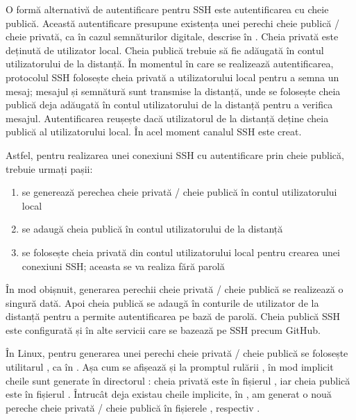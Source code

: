 O formă alternativă de autentificare pentru SSH este autentificarea cu cheie publică.
Această autentificare presupune existența unei perechi cheie publică / cheie privată, ca în cazul semnăturilor digitale, descrise în .
Cheia privată este deținută de utilizator local.
Cheia publică trebuie să fie adăugată în contul utilizatorului de la distanță.
În momentul în care se realizează autentificarea, protocolul SSH folosește cheia privată a utilizatorului local pentru a semna un mesaj; mesajul și semnătură sunt transmise la distanță, unde se folosește cheia publică deja adăugată în contul utilizatorului de la distanță pentru a verifica mesajul.
Autentificarea reușește dacă utilizatorul de la distanță deține cheia publică al utilizatorului local.
În acel moment canalul SSH este creat.

Astfel, pentru realizarea unei conexiuni SSH cu autentificare prin cheie publică, trebuie urmați pașii:
\begin{enumerate}
  \item se generează perechea cheie privată / cheie publică în contul utilizatorului local
  \item se adaugă cheia publică în contul utilizatorului de la distanță
  \item se folosește cheia privată din contul utilizatorului local pentru crearea unei conexiuni SSH; aceasta se va realiza fără parolă
\end{enumerate}

În mod obișnuit, generarea perechii cheie privată / cheie publică se realizează o singură dată.
Apoi cheia publică se adaugă în conturile de utilizator de la distanță pentru a permite autentificarea pe bază de parolă.
Cheia publică SSH este configurată și în alte servicii care se bazează pe SSH precum GitHub.

În Linux, pentru generarea unei perechi cheie privată / cheie publică se folosește utilitarul , ca în .
Așa cum se afișează și la promptul rulării , în mod implicit cheile sunt generate în directorul : cheia privată este în fișierul , iar cheia publică este în fișierul .
Întrucât deja existau cheile implicite, în , am generat o nouă pereche cheie privată / cheie publică în fișierele , respectiv .


